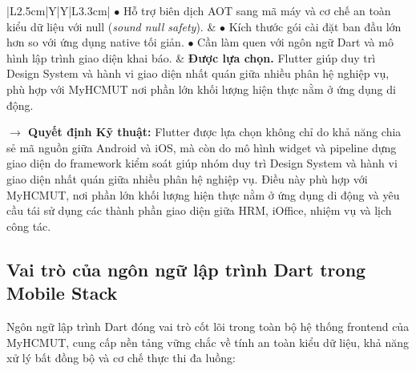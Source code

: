 \begin{table}[H]
\begin{tabularx}{\textwidth}{|L{2.5cm}|Y|Y|L{3.3cm}|}
    \newline 
    $\bullet$ Hỗ trợ biên dịch AOT sang mã máy và cơ chế an toàn kiểu dữ liệu với null (\textit{sound null safety}). & $\bullet$ Kích thước gói cài đặt ban đầu lớn hơn so với ứng dụng native tối giản. 
    \newline 
    $\bullet$ Cần làm quen với ngôn ngữ Dart và mô hình lập trình giao diện khai báo. & \textbf{Được lựa chọn.} Flutter giúp duy trì Design System và hành vi giao diện nhất quán giữa nhiều phân hệ nghiệp vụ, phù hợp với MyHCMUT nơi phần lớn khối lượng hiện thực nằm ở ứng dụng di động. \\ 
    \hline
    \end{tabularx}
    \caption{\textit{Bảng so sánh các nền tảng phát triển ứng dụng di động}}
    \label{tab:compare_mobile_framework}
\end{table}

\noindent \textbf{$\rightarrow$ Quyết định Kỹ thuật:} Flutter \cite{flutter_doc} được lựa chọn không chỉ do khả năng chia sẻ mã nguồn giữa Android và iOS, mà còn do mô hình widget và pipeline dựng giao diện do framework kiểm soát giúp nhóm duy trì Design System và hành vi giao diện nhất quán giữa nhiều phân hệ nghiệp vụ. Điều này phù hợp với MyHCMUT, nơi phần lớn khối lượng hiện thực nằm ở ứng dụng di động và yêu cầu tái sử dụng các thành phần giao diện giữa HRM, iOffice, nhiệm vụ và lịch công tác.

\subsection{Vai trò của ngôn ngữ lập trình Dart trong Mobile Stack}
\label{subsec:dart_language}

Ngôn ngữ lập trình Dart \cite{dart_doc} đóng vai trò cốt lõi trong toàn bộ hệ thống frontend của MyHCMUT, cung cấp nền tảng vững chắc về tính an toàn kiểu dữ liệu, khả năng xử lý bất đồng bộ và cơ chế thực thi đa luồng:

